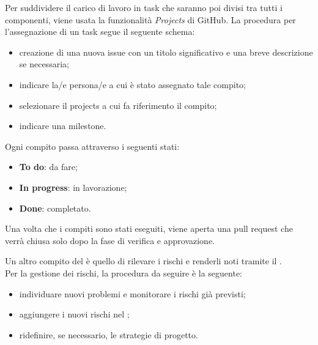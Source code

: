 Per suddividere il carico di lavoro in task che saranno poi divisi tra tutti i componenti, viene usata la funzionalità \textit{Projects} di GitHub. La procedura per l'assegnazione di un task segue il seguente schema:
\begin{itemize}
\item creazione di una nuova issue con un titolo significativo e una breve descrizione se necessaria;
\item indicare la/e persona/e a cui è stato assegnato tale compito;
\item selezionare il projects a cui fa riferimento il compito;
\item indicare una milestone.
\end{itemize}
Ogni compito passa attraverso i seguenti stati:
\begin{itemize}
\item \textbf{To do}: da fare;
\item \textbf{In progress}: in lavorazione;
\item \textbf{Done}: completato.
\end{itemize}
Una volta che i compiti sono stati eseguiti, viene aperta una pull request che verrà chiusa solo dopo la fase di verifica e approvazione.

Un altro compito del \respProg{} è quello di rilevare i rischi e renderli noti tramite il \PdP. \\
Per la gestione dei rischi, la procedura da seguire è la seguente:
\begin{itemize}
\item individuare nuovi problemi e monitorare i rischi già previsti;
\item aggiungere i nuovi rischi nel \PdP;
\item ridefinire, se necessario, le strategie di progetto.
\end{itemize}
